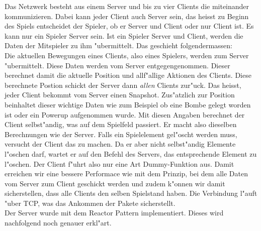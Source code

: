 Das Netzwerk besteht aus einem Server und bis zu vier Clients die miteinander kommunizieren. Dabei kann jeder Client auch Server sein, das heisst
zu Beginn des Spiels entscheidet der Spieler, ob er Server und Client oder nur Client ist. Es kann nur ein Spieler Server sein.
Ist ein Spieler Server und Client, werden die Daten der Mitspieler zu ihm "ubermittelt. Das geschieht folgendermassen: \\
Die aktuellen Bewegungen eines Clients, also eines Spielers, werden zum Server "ubermittelt. Diese Daten werden vom Server
entgegengenommen. Dieser berechnet damit die aktuelle Position und allf"allige Aktionen des Clients. Diese berechnete Postion schickt der Server dann \textit{allen} Clients
zur"uck. Das heisst, jeder Client bekommt vom Server einen Snapshot. Zus"atzlich zur Position beinhaltet dieser wichtige Daten wie zum Beispiel ob
eine Bombe gelegt worden ist oder ein Powerup aufgenommen wurde. Mit diesen Angaben berechnet der Client selbst"andig, was auf dem
Spielfeld passiert. Er macht also dieselben Berechnungen wie der Server. Falls ein Spielelement gel"oscht werden muss,
versucht der Client das zu machen. Da er aber nicht selbst"andig Elemente l"oschen darf, wartet er auf den Befehl des Servers,
das entsprechende Element zu l"oschen. Der Client f"uhrt also nur eine Art Dummy-Funktion aus.
Damit erreichen wir eine bessere Performace wie mit dem Prinzip, bei dem alle Daten vom Server zum Client geschickt werden und zudem
k"onnen wir damit sicherstellen, dass alle Clients den selben Spielstand haben. Die Verbindung l"auft "uber TCP, was das Ankommen
der Pakete sicherstellt. \\
Der Server wurde mit dem Reactor Pattern implementiert. Dieses wird nachfolgend noch genauer erkl"art.

